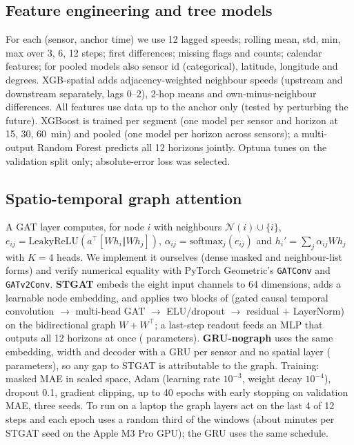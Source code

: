 \documentclass[conference]{IEEEtran}
\begin{document}
\subsection{Feature engineering and tree models}
For each (sensor, anchor time) we use 12 lagged speeds; rolling mean, std, min, max over 3, 6, 12 steps; first differences; missing flags and counts; calendar features; for pooled models also sensor id (categorical), latitude, longitude and degrees.
XGB-spatial adds adjacency-weighted neighbour speeds (upstream and downstream separately, lags 0--2), 2-hop means and own-minus-neighbour differences.
All features use data up to the anchor only (tested by perturbing the future).
XGBoost \cite{chen2016xgboost} is trained per segment (one model per sensor and horizon at 15, 30, 60~min) and pooled (one model per horizon across sensors); a multi-output Random Forest \cite{breiman2001rf} predicts all 12 horizons jointly.
Optuna tunes on the validation split only; absolute-error loss was selected.

\subsection{Spatio-temporal graph attention}
A GAT layer computes, for node $i$ with neighbours $\mathcal N(i)\cup\{i\}$, $e_{ij}=\mathrm{LeakyReLU}(a^\top[Wh_i\Vert Wh_j])$, $\alpha_{ij}=\mathrm{softmax}_j(e_{ij})$ and $h_i'=\sum_j\alpha_{ij}Wh_j$ with $K=4$ heads.
We implement it ourselves (dense masked and neighbour-list forms) and verify numerical equality with PyTorch Geometric's \texttt{GATConv} and \texttt{GATv2Conv}.
\textbf{STGAT} embeds the eight input channels to 64 dimensions, adds a learnable node embedding, and applies two blocks of (gated causal temporal convolution $\to$ multi-head GAT $\to$ ELU/dropout $\to$ residual $+$ LayerNorm) on the bidirectional graph $W+W^\top$; a last-step readout feeds an MLP that outputs all 12 horizons at once (\nParamsStgat{} parameters).
\textbf{GRU-nograph} uses the same embedding, width and decoder with a GRU per sensor and no spatial layer (\nParamsGru{} parameters), so any gap to STGAT is attributable to the graph.
Training: masked MAE in scaled space, Adam (learning rate $10^{-3}$, weight decay $10^{-4}$), dropout 0.1, gradient clipping, up to 40 epochs with early stopping on validation MAE, three seeds.
To run on a laptop the graph layers act on the last 4 of 12 steps and each epoch uses a random third of the windows (about \trainMinStgat{} minutes per STGAT seed on the Apple M3 Pro GPU); the GRU uses the same schedule.
\end{document}
